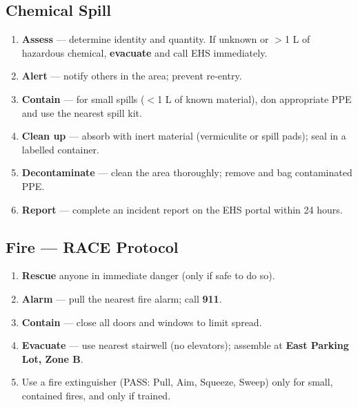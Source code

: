 \documentclass[11pt,a4paper]{article}
\begin{document}
\subsection{Chemical Spill}
\begin{enumerate}[noitemsep, topsep=2pt, leftmargin=1.6em, label=\textcolor{accent}{\bfseries\arabic*.}]
  \item \textbf{Assess} --- determine identity and quantity. If unknown or $>$1 L of hazardous chemical, \textbf{evacuate} and call EHS immediately.
  \item \textbf{Alert} --- notify others in the area; prevent re-entry.
  \item \textbf{Contain} --- for small spills ($<$1 L of known material), don appropriate PPE and use the nearest spill kit.
  \item \textbf{Clean up} --- absorb with inert material (vermiculite or spill pads); seal in a labelled container.
  \item \textbf{Decontaminate} --- clean the area thoroughly; remove and bag contaminated PPE.
  \item \textbf{Report} --- complete an incident report on the EHS portal within 24 hours.
\end{enumerate}

\subsection{Fire --- RACE Protocol}
\begin{enumerate}[noitemsep, topsep=2pt, leftmargin=1.6em, label=\textcolor{accent}{\bfseries\arabic*.}]
  \item \textbf{Rescue} anyone in immediate danger (only if safe to do so).
  \item \textbf{Alarm} --- pull the nearest fire alarm; call \textbf{911}.
  \item \textbf{Contain} --- close all doors and windows to limit spread.
  \item \textbf{Evacuate} --- use nearest stairwell (no elevators); assemble at \textbf{East Parking Lot, Zone B}.
  \item Use a fire extinguisher (PASS: Pull, Aim, Squeeze, Sweep) only for small, contained fires, and only if trained.
\end{enumerate}
\end{document}
